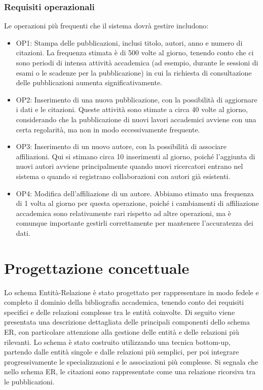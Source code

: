 \documentclass[a4paper,12pt]{article}
\begin{document}
\subsubsection{Requisiti operazionali}
Le operazioni più frequenti che il sistema dovrà gestire includono:
\begin{itemize}[label=\textbullet]
    \item OP1: Stampa delle pubblicazioni, inclusi titolo, autori, anno e numero di citazioni. La frequenza stimata è di 500 volte al giorno, tenendo conto che ci sono periodi di intensa attività accademica (ad esempio, durante le sessioni di esami o le scadenze per la pubblicazione) in cui la richiesta di consultazione delle pubblicazioni aumenta significativamente.
    \item OP2: Inserimento di una nuova pubblicazione, con la possibilità di aggiornare i dati e le citazioni. Queste attività sono stimate a circa 40 volte al giorno, considerando che la pubblicazione di nuovi lavori accademici avviene con una certa regolarità, ma non in modo eccessivamente frequente.
    \item OP3: Inserimento di un nuovo autore, con la possibilità di associare affiliazioni. Qui si stimano circa 10 inserimenti al giorno, poiché l'aggiunta di nuovi autori avviene principalmente quando nuovi ricercatori entrano nel sistema o quando si registrano collaborazioni con autori già esistenti.
    \item OP4: Modifica dell'affiliazione di un autore. Abbiamo stimato una frequenza di 1 volta al giorno per questa operazione, poiché i cambiamenti di affiliazione accademica sono relativamente rari rispetto ad altre operazioni, ma è comunque importante gestirli correttamente per mantenere l'accuratezza dei dati.
\end{itemize} 

\section{Progettazione concettuale} \label{sec:progettazione-concettuale}
Lo schema Entità-Relazione è stato progettato per rappresentare in modo fedele e completo il dominio della bibliografia accademica, tenendo conto dei requisiti specifici e delle relazioni complesse tra le entità coinvolte. Di seguito viene presentata una descrizione dettagliata delle principali componenti dello schema ER, con particolare attenzione alla gestione delle entità e delle relazioni più rilevanti. Lo schema è stato costruito utilizzando una tecnica bottom-up, partendo dalle entità singole e dalle relazioni più semplici, per poi integrare progressivamente le specializzazioni e le associazioni più complesse. Si segnala che nello schema ER, le citazioni sono rappresentate come una relazione ricorsiva tra le pubblicazioni.
\end{document}
